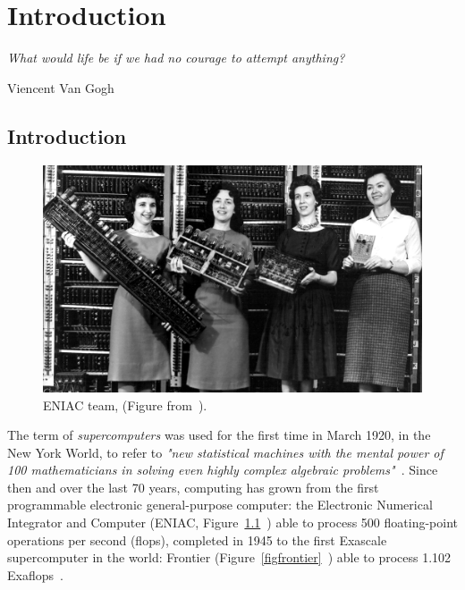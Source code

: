 \pagestyle{fancy}
\fancyhead{}
\fancyfoot{}
\fancyfoot[RO,LE]{\thepage}



\chapter{Introduction}\label{chap:intro}
\vspace{20mm}
\epigraph{\textit{ What would life be if we had no courage to attempt anything?}} {Viencent Van Gogh}

\newpage

\section{Introduction}

\begin{figure}
\includegraphics[width=0.9\linewidth]{figures/ENIAC-team.png}
\caption{ENIAC team, (Figure from~\cite{eniac}).}
\label{figeniac}
\end{figure}


The term of \textit{supercomputers} was used for the first time in March 1920, in the New York World, to refer to \textit{"new statistical machines with the mental power of 100 mathematicians in solving even highly complex algebraic problems"}~\cite{schneck_supercomputer_1987}. Since then and over the last 70 years, computing has grown from the first programmable electronic general-purpose computer: the Electronic Numerical Integrator and Computer (ENIAC, Figure~\ref{figeniac}~\cite{eniac}) able to process 500 floating-point operations per second (flops), completed in 1945 to the first Exascale supercomputer in the world: Frontier (Figure~\ref{figfrontier}~\cite{frontier-image}) able to process 1.102 Exaflops~\cite{top500, frontier}. 

